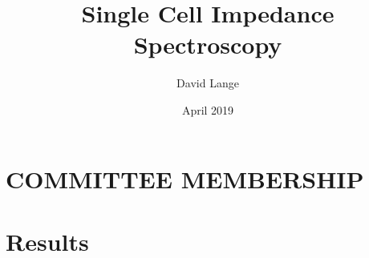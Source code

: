 \documentclass[12pt]{report}
\title{Single Cell Impedance Spectroscopy}
\author{David Lange}
\date{April 2019}
\begin{document}




\chapter*{COMMITTEE MEMBERSHIP}




%

%

\tableofcontents

\listoffigures

\listoftables

\doublespacing

%
\newpage
{}





%

%

%

%

\chapter{Results}

\end{document}
